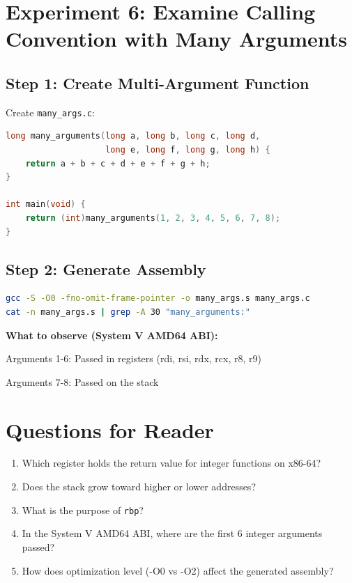 \section{Experiment 6: Examine Calling Convention with Many Arguments}

\subsection{Step 1: Create Multi-Argument Function}

Create \texttt{many\_args.c}:

\begin{lstlisting}[language=C]
long many_arguments(long a, long b, long c, long d,
                    long e, long f, long g, long h) {
    return a + b + c + d + e + f + g + h;
}

int main(void) {
    return (int)many_arguments(1, 2, 3, 4, 5, 6, 7, 8);
}
\end{lstlisting}

\subsection{Step 2: Generate Assembly}

\begin{lstlisting}[language=bash]
gcc -S -O0 -fno-omit-frame-pointer -o many_args.s many_args.c
cat -n many_args.s | grep -A 30 "many_arguments:"
\end{lstlisting}

\textbf{What to observe (System V AMD64 ABI):}

Arguments 1-6: Passed in registers (rdi, rsi, rdx, rcx, r8, r9)

Arguments 7-8: Passed on the stack

\section{Questions for Reader}

\begin{enumerate}
\item Which register holds the return value for integer functions on x86-64?
\item Does the stack grow toward higher or lower addresses?
\item What is the purpose of \texttt{rbp}?
\item In the System V AMD64 ABI, where are the first 6 integer arguments passed?
\item How does optimization level (-O0 vs -O2) affect the generated assembly?
\end{enumerate}

